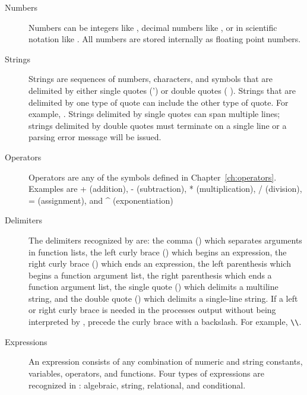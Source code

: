 \begin{description}
\item[Numbers] Numbers can be integers like , decimal numbers
like , or in scientific notation like . All numbers
are stored internally as floating point numbers.

\item[Strings] Strings are sequences of numbers, characters, and symbols
that are delimited by either single quotes (') or double quotes ( ). Strings that are delimited by one type of quote
can include the other type of quote. For example, .  Strings delimited by single
quotes can span multiple lines; strings delimited by double quotes
must terminate on a single line or a parsing error message will be
issued.

\item[Operators]
Operators are any of the symbols defined in
Chapter~\ref{ch:operators}. Examples are + (addition), -
(subtraction), * (multiplication), / (division), = (assignment), and
\textasciicircum{} (exponentiation)

\item[Delimiters] The delimiters recognized by \aprepro{} are: the
comma (\cmd{,}) which separates arguments in function lists, the
left curly brace (\cmd{\{}) which begins an expression, the right
curly brace (\cmd{\}}) which ends an expression, the left parenthesis
\cmd{(} which begins a function argument list, the right
parenthesis \cmd{)} which ends a function argument list, the
single quote () which delimits a multiline string, and the double
quote () which delimits a single-line string. If a left
or right curly brace is needed in the processes output without being
interpreted by \aprepro{}, precede the curly brace with a backslash.
For example, \verb+\+\cmd{\{ }\verb+\+\cmd{\}}.

\item[Expressions] An expression consists of any combination of numeric
and string constants, variables, operators, and functions. Four types
of expressions are recognized in \aprepro{}: algebraic, string,
relational, and conditional.


\end{description}
